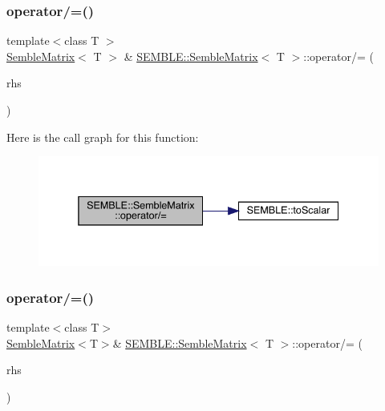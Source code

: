 \subsubsection{\texorpdfstring{operator/=()}{operator/=()}\hspace{0.1cm}{\footnotesize\ttfamily [4/6]}}
{\footnotesize\ttfamily template$<$class T $>$ \\
\mbox{\hyperlink{structSEMBLE_1_1SembleMatrix}{Semble\+Matrix}}$<$ T $>$ \& \mbox{\hyperlink{structSEMBLE_1_1SembleMatrix}{S\+E\+M\+B\+L\+E\+::\+Semble\+Matrix}}$<$ T $>$\+::operator/= (\begin{DoxyParamCaption}\item[{const typename \mbox{\hyperlink{structSEMBLE_1_1PromoteScalar}{Promote\+Scalar}}$<$ T $>$\+::Type \&}]{rhs }\end{DoxyParamCaption})}

Here is the call graph for this function\+:
\nopagebreak
\begin{figure}[H]
\begin{center}
\leavevmode
\includegraphics[width=338pt]{df/d87/structSEMBLE_1_1SembleMatrix_ab57fe2184f8f547f2cf6cdf71143f67f_cgraph}
\end{center}
\end{figure}
\mbox{\label{structSEMBLE_1_1SembleMatrix_a2ecb3f62dbf02cbf3e0b9dc4828ce844}} 
\subsubsection{\texorpdfstring{operator/=()}{operator/=()}\hspace{0.1cm}{\footnotesize\ttfamily [5/6]}}
{\footnotesize\ttfamily template$<$class T$>$ \\
\mbox{\hyperlink{structSEMBLE_1_1SembleMatrix}{Semble\+Matrix}}$<$T$>$\& \mbox{\hyperlink{structSEMBLE_1_1SembleMatrix}{S\+E\+M\+B\+L\+E\+::\+Semble\+Matrix}}$<$ T $>$\+::operator/= (\begin{DoxyParamCaption}\item[{const typename \mbox{\hyperlink{structSEMBLE_1_1PromoteEnsem}{Promote\+Ensem}}$<$ T $>$\+::Type \&}]{rhs }\end{DoxyParamCaption})}

